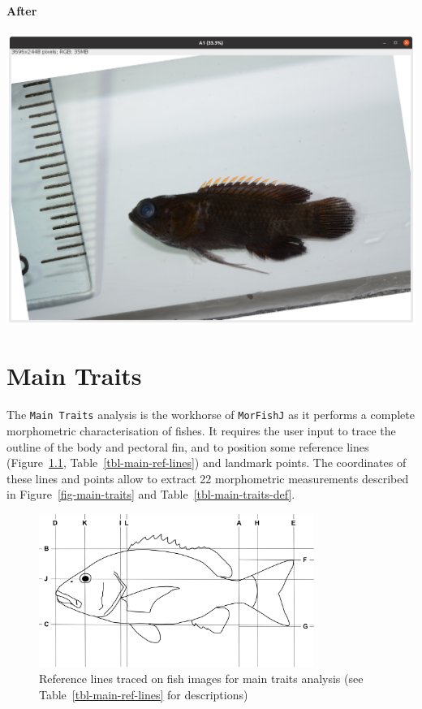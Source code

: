 \documentclass[
  letterpaper,
  DIV=11,
  numbers=noendperiod,
  oneside]{scrreprt}
\begin{document}
\hypertarget{after-1}{%
\subsubsection{\texorpdfstring{\textbf{After}}{After}}\label{after-1}}

\includegraphics{./images/screenshots/rotated_example.png}

\hypertarget{sec-main_traits}{%
\chapter{Main Traits}\label{sec-main_traits}}

The \texttt{Main\ Traits} analysis is the workhorse of \texttt{MorFishJ}
as it performs a complete morphometric characterisation of fishes. It
requires the user input to trace the outline of the body and pectoral
fin, and to position some reference lines
(Figure~\ref{fig-main-ref-lines}, Table~\ref{tbl-main-ref-lines}) and
landmark points. The coordinates of these lines and points allow to
extract 22 morphometric measurements described in
Figure~\ref{fig-main-traits} and Table~\ref{tbl-main-traits-def}.

\begin{figure}

{\centering \includegraphics[width=0.8\textwidth,height=\textheight]{./images/drawings/main_ref_lines_sketch.png}

}

\caption{\label{fig-main-ref-lines}Reference lines traced on fish images
for main traits analysis (see Table~\ref{tbl-main-ref-lines} for
descriptions)}

\end{figure}
\end{document}
